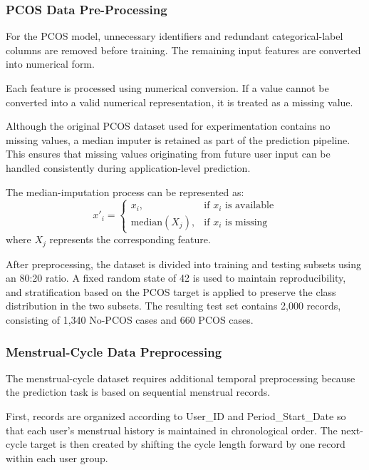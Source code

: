\subsubsection{PCOS Data Pre-Processing}
For the PCOS model, unnecessary identifiers and redundant categorical-label columns are removed before training. The remaining input features are converted into numerical form.

Each feature is processed using numerical conversion. If a value cannot be converted into a valid numerical representation, it is treated as a missing value.

Although the original PCOS dataset used for experimentation contains no missing values, a median imputer is retained as part of the prediction pipeline. This ensures that missing values originating from future user input can be handled consistently during application-level prediction.

The median-imputation process can be represented as:
\begin{equation}
x'_i = 
\begin{cases} 
x_i, & \text{if } x_i \text{ is available} \\ 
\text{median}(X_j), & \text{if } x_i \text{ is missing} 
\end{cases}
\end{equation}
where $X_j$ represents the corresponding feature.

After preprocessing, the dataset is divided into training and testing subsets using an 80:20 ratio. A fixed random state of 42 is used to maintain reproducibility, and stratification based on the PCOS target is applied to preserve the class distribution in the two subsets. The resulting test set contains 2,000 records, consisting of 1,340 No-PCOS cases and 660 PCOS cases.

\subsubsection{Menstrual-Cycle Data Preprocessing}

The menstrual-cycle dataset requires additional temporal preprocessing because the prediction task is based on sequential menstrual records.

First, records are organized according to User\_ID and Period\_Start\_Date so that each user's menstrual history is maintained in chronological order. The next-cycle target is then created by shifting the cycle length forward by one record within each user group.

